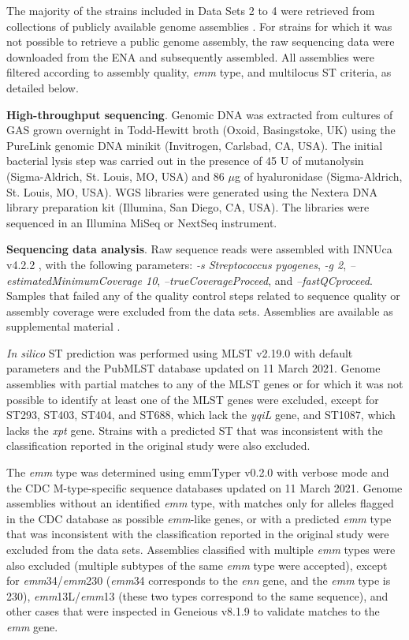 The majority of the strains included in Data Sets 2 to 4 \cite{friaes_supplemental_2023} were retrieved from collections of publicly available genome assemblies \cite{blackwell_exploring_2021, oleary_reference_2016}. For strains for which it was not possible to retrieve a public genome assembly, the raw sequencing data were downloaded from the \ac{ENA} and subsequently assembled. All assemblies were ﬁltered according to assembly quality, \textit{emm} type, and multilocus \ac{ST} criteria, as detailed below.

\textbf{High-throughput sequencing}. Genomic DNA was extracted from cultures of \ac{GAS} grown overnight in Todd-Hewitt broth (Oxoid, Basingstoke, UK) using the PureLink genomic DNA minikit (Invitrogen, Carlsbad, CA, USA). The initial bacterial lysis step was carried out in the presence of 45 U of mutanolysin (Sigma-Aldrich, St. Louis, MO, USA) and 86 $\mu$g of hyaluronidase (Sigma-Aldrich, St. Louis, MO, USA). \ac{WGS} libraries were generated using the Nextera DNA library preparation kit (Illumina, San Diego, CA, USA). The libraries were sequenced in an Illumina MiSeq or NextSeq instrument.

\textbf{Sequencing data analysis}. Raw sequence reads were assembled with INNUca v4.2.2 \cite{noauthor_release_nodate}, with the following parameters: \textit{-s Streptococcus pyogenes}, \textit{-g 2}, \textit{–estimatedMinimumCoverage 10}, \textit{–trueCoverageProceed}, and \textit{–fastQCproceed}. Samples that failed any of the quality control steps related to sequence quality or assembly coverage were excluded from the data sets. Assemblies are available as supplemental material \cite{friaes_supplemental_2023}.

\textit{In silico} \ac{ST} prediction was performed using MLST v2.19.0 \cite{seemann_mlst_nodate} with default parameters and the PubMLST database updated on 11 March 2021. Genome assemblies with partial matches to any of the \ac{MLST} genes or for which it was not possible to identify at least one of the \ac{MLST} genes were excluded, except for ST293, ST403, ST404, and ST688, which lack the \textit{yqiL} gene, and ST1087, which lacks the \textit{xpt} gene. Strains with a predicted \ac{ST} that was inconsistent with the classiﬁcation reported in the original study were also excluded.

The \textit{emm} type was determined using emmTyper v0.2.0 \cite{noauthor_release_nodate-2} with verbose mode and the \ac{CDC} M-type-speciﬁc sequence databases updated on 11 March 2021. Genome assemblies without an identiﬁed \textit{emm} type, with matches only for alleles ﬂagged in the \ac{CDC} database as possible \textit{emm}-like genes, or with a predicted \textit{emm} type that was inconsistent with the classiﬁcation reported in the original study were excluded from the data sets. Assemblies classiﬁed with multiple \textit{emm} types were also excluded (multiple subtypes of the same \textit{emm} type were accepted), except for \textit{emm}34/\textit{emm}230 (\textit{emm}34 corresponds to the \textit{enn} gene, and the \textit{emm} type is 230), \textit{emm}13L/\textit{emm}13 (these two types correspond to the same sequence), and other cases that were inspected in Geneious v8.1.9 to validate matches to the \textit{emm} gene.

